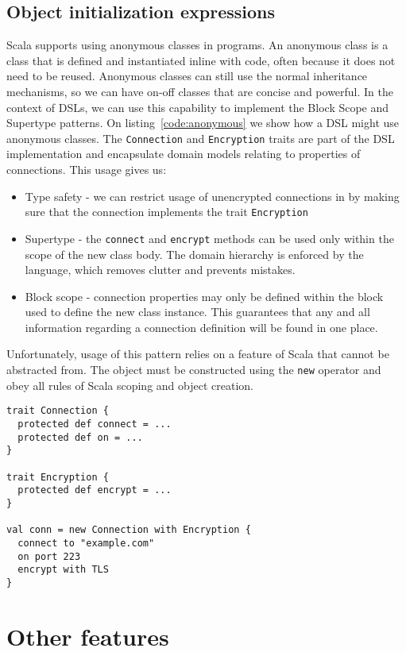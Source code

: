 \subsection{Object initialization expressions}

Scala supports using anonymous classes in programs.
An anonymous class is a class that is defined and instantiated inline with code, often because it does not need to be reused.
Anonymous classes can still use the normal inheritance mechanisms, so we can have on-off classes that are concise and powerful.
In the context of DSLs, we can use this capability to implement the Block Scope and Supertype patterns.
On listing~\ref{code:anonymous} we show how a DSL might use anonymous classes.
The \texttt{Connection} and \texttt{Encryption} traits are part of the DSL implementation and encapsulate domain models relating to properties of connections.
This usage gives us:
\begin{itemize}
	\item Type safety - we can restrict usage of unencrypted connections in by making sure that the connection implements the trait \texttt{Encryption}
	\item Supertype - the \texttt{connect} and \texttt{encrypt} methods can be used only within the scope of the new class body.
The domain hierarchy is enforced by the language, which removes clutter and prevents mistakes.
	\item Block scope - connection properties may only be defined within the block used to define the new class instance.
This guarantees that any and all information regarding a connection definition will be found in one place.
\end{itemize}

Unfortunately, usage of this pattern relies on a feature of Scala that cannot be abstracted from.
The object must be constructed using the \texttt{new} operator and obey all rules of Scala scoping and object creation.

\begin{lstlisting}[caption=Anonymous classes, label=code:anonymous]
trait Connection {
  protected def connect = ...
  protected def on = ...
}

trait Encryption {
  protected def encrypt = ...
}

val conn = new Connection with Encryption {
  connect to "example.com"
  on port 223
  encrypt with TLS
}
\end{lstlisting}

\section{Other features}

